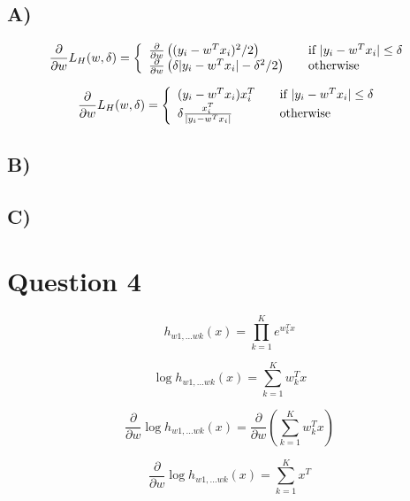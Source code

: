 \documentclass{report}
\begin{document}
\subsection*{A)}
\begin{equation}
  \frac{\partial}{\partial w} L_H(w, \delta) = \left\{
  \begin{array}{l l}
    \frac{\partial}{\partial w} \left((y_i - w^Tx_i)^2 / 2 \right)& \quad \text{if }  | y_i - w^Tx_i | \leq \delta\\
    \frac{\partial}{\partial w} \left(\delta | y_i - w^Tx_i | - \delta^2 / 2\right) & \quad \text{otherwise}

  \end{array} \right.\end{equation}

\begin{equation}
  \frac{\partial}{\partial w} L_H(w, \delta) = \left\{
  \begin{array}{l l}
    (y_i - w^Tx_i) x_i^T & \quad \text{if }  | y_i - w^Tx_i | \leq \delta\\
    \delta \frac{x_i^T}{| y_i - w^Tx_i |} & \quad \text{otherwise}

  \end{array} \right.\end{equation}
\subsection*{B)}
\subsection*{C)}


\section*{Question 4}
  \begin{equation}
    h_{w1,...wk}(x) = \prod_{k=1}^{K}e^{w_k^Tx}
  \end{equation}

  \begin{equation}
    \log h_{w1,...wk}(x) = \sum_{k=1}^{K} w_k^Tx
  \end{equation}

  \begin{equation}
    \frac{\partial}{\partial w} \log h_{w1,...wk}(x) = \frac{\partial}{\partial w} \left(\sum_{k=1}^{K} w_k^Tx\right)
  \end{equation}

  \begin{equation}
    \frac{\partial}{\partial w} \log h_{w1,...wk}(x) = \sum_{k=1}^{K} x^T
  \end{equation}
\end{document}
